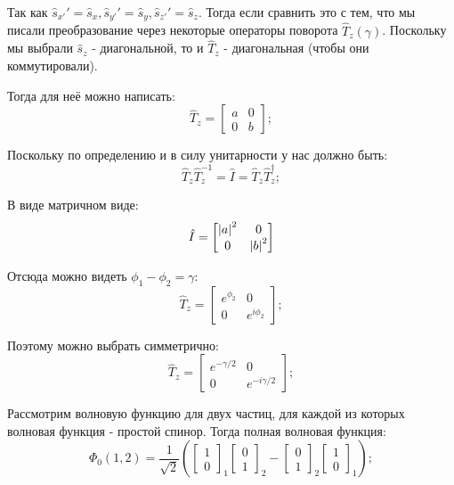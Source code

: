 \documentclass[a4paper, 14pt, russian]{article}
\newcommand{\be}{\begin{equation}}
\newcommand{\ee}{\end{equation}}
\begin{document}
	Так как $\hat{s}_{x'}' = \hat{s}_{x}, \hat{s}_{y'}' = \hat{s}_{y}, \hat{s}_{z'}' = \hat{s}_{z}$.
	Тогда если сравнить это с тем, что мы писали преобразование через некоторые операторы поворота 
	$\hat{T}_z(\gamma)$. Поскольку мы выбрали $\hat{s}_z$ - диагональной, то и 
	$\hat{T}_z$ - диагональная (чтобы они коммутировали).

	Тогда для неё можно написать:
	\be
		\hat{T}_z = 
			\begin{bmatrix}
					a	&	0\\
					0	&	b
			\end{bmatrix};
	\ee

	Поскольку по определению и в силу унитарности у нас должно быть:
	\be
		\hat{T}_z \hat{T}_z^{-1} = \hat{I} = \hat{T}_z \hat{T}_z^\dagger;
	\ee

	В виде матричном виде:
	\be
		\hat{I} = 
			\begin{bmatrix}
				\abs{a}^2	&	0\\
				0	&	\abs{b}^2
			\end{bmatrix}
	\ee

	Отсюда можно видеть $\phi_1 - \phi_2 = \gamma$:
	\be
		\hat{T}_z = 
			\begin{bmatrix}
					e^{\phi_2}	&	0\\
					0	&	e^{i\phi_2}
			\end{bmatrix};
	\ee

	Поэтому можно выбрать симметрично:
	\be
		\hat{T}_z = 
			\begin{bmatrix}
					e^{-\gamma / 2}	&	0\\
					0	&	e^{-i\gamma / 2}
			\end{bmatrix};
	\ee

	Рассмотрим волновую функцию для двух частиц, 
	для каждой из которых волновая функция - простой спинор.
	Тогда полная волновая функция:
	\be
		\Phi_0(1,2) = \frac{1}{\sqrt 2} 
			\left(
				\begin{bmatrix} 1 \\ 0 \end{bmatrix}_1
				\begin{bmatrix} 0 \\ 1 \end{bmatrix}_2
					-
				\begin{bmatrix} 0 \\ 1 \end{bmatrix}_2
				\begin{bmatrix} 1 \\ 0 \end{bmatrix}_1
			\right);
	\ee
\end{document}
